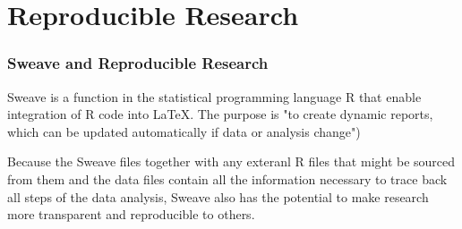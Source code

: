 \documentclass[pdf]{beamer}
\begin{document}
\section{Reproducible Research}
\begin{frame}
  \frametitle{Sweave and Reproducible Research}
  Sweave is a function in the statistical programming language R that enable integration of R code into LaTeX. The purpose is "to create dynamic reports, which can be updated automatically if data or analysis change")
  
Because the  Sweave files together with any exteranl R files that might be sourced from them and the data files contain all the information necessary to trace back all steps of the data analysis, Sweave also has the potential to make research more transparent and reproducible to others.
\end{frame}
\end{document}
